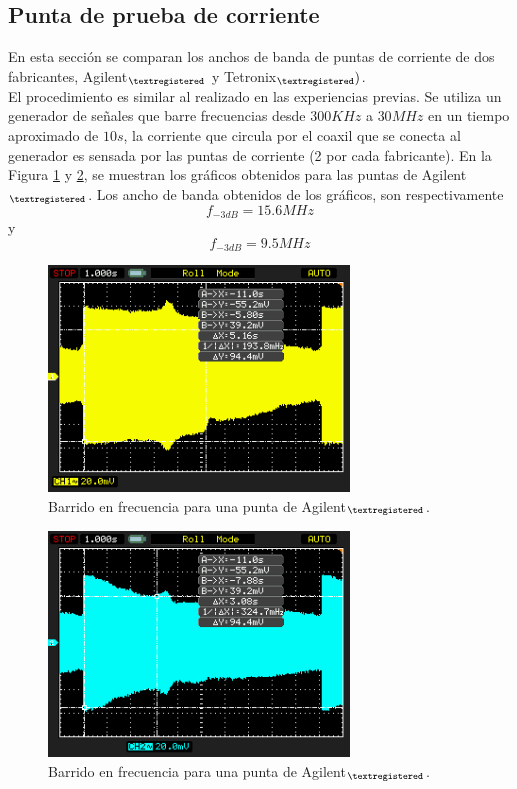\documentclass[a4paper,10pt]{article}
\begin{document}
		\subsection{Punta de prueba de corriente}
		\indent En esta secci\'on se comparan los anchos de banda de puntas de
		corriente de dos fabricantes, Agilent$_{\textregistered}$  y 
		Tetronix$_{\textregistered} )$. \\
		\indent El procedimiento es similar al realizado en las experiencias 
		previas. Se utiliza un generador de se\~nales que barre frecuencias 
		desde $300KHz$ a $30MHz$ en un tiempo aproximado de $10s$, la 
		corriente que circula por el coaxil que se conecta al generador es 
		sensada por las puntas de corriente (2 por cada fabricante). En la 
		Figura \ref{img004} y \ref{img005}, se muestran los gr\'aficos 
		obtenidos para las puntas de Agilent$_{\textregistered}$. Los ancho de
		banda obtenidos de los gr\'aficos, son respectivamente 
		$$f_{-3dB}=15.6MHz$$ y $$f_{-3dB}=9.5MHz$$
		
		\begin{figure}[!htb]
			\centering
			\includegraphics[width=8cm]
			{Imagenes/Mediciones instrumentos/NewFile5.png}
			\caption{Barrido en frecuencia para una punta de 
			Agilent$_{\textregistered}$.} \label{img004}
		\end{figure}
		
		\begin{figure}[!htb]
			\centering
			\includegraphics[width=8cm]
			{Imagenes/Mediciones instrumentos/NewFile6.png}
			\caption{Barrido en frecuencia para una punta de 
			Agilent$_{\textregistered}$.} \label{img005}
		\end{figure}				
		
\end{document}
